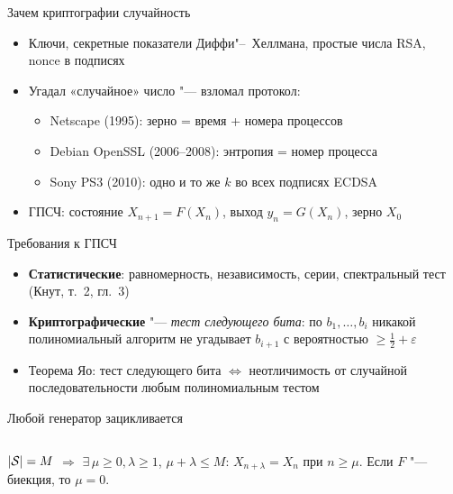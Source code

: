 \documentclass{ca-slides}
\author{}
\begin{document}
\titleframe

\begin{canvasframe}{Зачем криптографии случайность}
  \begin{itemize}
    \item Ключи, секретные показатели Диффи"--~Хеллмана, простые числа RSA, nonce в подписях
    \item Угадал «случайное» число "--- взломал протокол:
    \begin{itemize}
      \item Netscape (1995): зерно = время + номера процессов
      \item Debian OpenSSL (2006--2008): энтропия = номер процесса
      \item Sony PS3 (2010): одно и то же $k$ во всех подписях ECDSA
    \end{itemize}
    \item ГПСЧ: состояние $X_{n+1} = F(X_n)$, выход $y_n = G(X_n)$, зерно $X_0$
  \end{itemize}
\end{canvasframe}

\begin{canvasframe}{Требования к ГПСЧ}
  \begin{itemize}
    \item \textbf{Статистические}: равномерность, независимость, серии, спектральный тест
      (Кнут, т.~2, гл.~3)
    \item \textbf{Криптографические} "--- \emph{тест следующего бита}: по $b_1, \dots, b_i$ никакой
      полиномиальный алгоритм не угадывает $b_{i+1}$ с вероятностью $\ge \frac12 + \varepsilon$
    \item Теорема Яо: тест следующего бита $\iff$ неотличимость от случайной
      последовательности любым полиномиальным тестом
  \end{itemize}
  \penspace[0.25\textheight]
\end{canvasframe}

\begin{canvasframe}{Любой генератор зацикливается}
  \begin{columns}[T]
      \begin{proposition}
        $\lvert\mathcal{S}\rvert = M$ $\Rightarrow$ $\exists\,\mu \ge 0, \lambda \ge 1$, $\mu + \lambda \le M$:
        $X_{n+\lambda} = X_n$ при $n \ge \mu$. Если $F$ "--- биекция, то $\mu = 0$.
      \end{proposition}
      \centering{}
  \end{columns}
\end{canvasframe}
\end{document}
